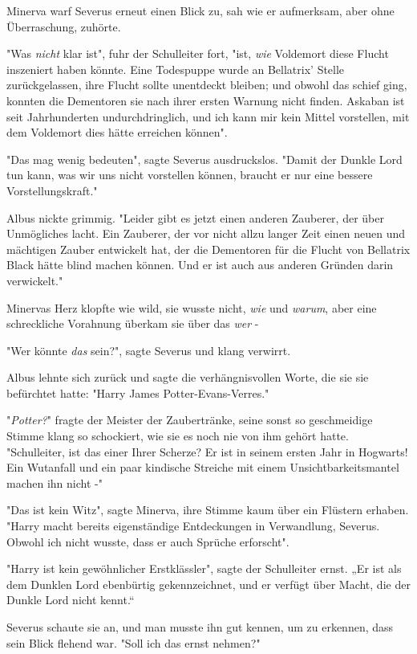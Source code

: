 {Minerva warf Severus erneut einen Blick zu, sah wie er aufmerksam, aber ohne Überraschung, zuhörte.

"Was \emph{nicht} klar ist", fuhr der Schulleiter fort, "ist, \emph{wie} Voldemort diese Flucht inszeniert haben könnte. Eine Todespuppe wurde an Bellatrix' Stelle zurückgelassen, ihre Flucht sollte unentdeckt bleiben; und obwohl das schief ging, konnten die Dementoren sie nach ihrer ersten Warnung nicht finden. Askaban ist seit Jahrhunderten undurchdringlich, und ich kann mir kein Mittel vorstellen, mit dem Voldemort dies hätte erreichen können".

"Das mag wenig bedeuten", sagte Severus ausdruckslos. "Damit der Dunkle Lord tun kann, was wir uns nicht vorstellen können, braucht er nur eine bessere Vorstellungskraft."

Albus nickte grimmig. "Leider gibt es jetzt einen anderen Zauberer, der über Unmögliches lacht. Ein Zauberer, der vor nicht allzu langer Zeit einen neuen und mächtigen Zauber entwickelt hat, der die Dementoren für die Flucht von Bellatrix Black hätte blind machen können. Und er ist auch aus anderen Gründen darin verwickelt."

Minervas Herz klopfte wie wild, sie wusste nicht, \emph{wie} und \emph{warum}, aber eine schreckliche Vorahnung überkam sie über das \emph{wer} -

"Wer könnte \emph{das} sein?", sagte Severus und klang verwirrt.

Albus lehnte sich zurück und sagte die verhängnisvollen Worte, die sie sie befürchtet hatte: "Harry James Potter-Evans-Verres."

"\emph{Potter?}" fragte der Meister der Zaubertränke, seine sonst so geschmeidige Stimme klang so schockiert, wie sie es noch nie von ihm gehört hatte. "Schulleiter, ist das einer Ihrer Scherze? Er ist in seinem ersten Jahr in Hogwarts! Ein Wutanfall und ein paar kindische Streiche mit einem Unsichtbarkeitsmantel machen ihn nicht -"

"Das ist kein Witz", sagte Minerva, ihre Stimme kaum über ein Flüstern erhaben. "Harry macht bereits eigenständige Entdeckungen in Verwandlung, Severus. Obwohl ich nicht wusste, dass er auch Sprüche erforscht".

"Harry ist kein gewöhnlicher Erstklässler", sagte der Schulleiter ernst. „Er ist als dem Dunklen Lord ebenbürtig gekennzeichnet, und er verfügt über Macht, die der Dunkle Lord nicht kennt.“

Severus schaute sie an, und man musste ihn gut kennen, um zu erkennen, dass sein Blick flehend war. "Soll ich das ernst nehmen?"

}
